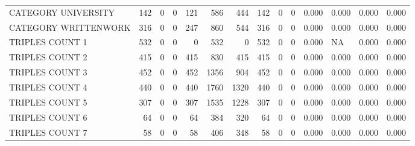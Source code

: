 \begin{tabular}{lrrrrrrrrrllll}
 CATEGORY UNIVERSITY      &             142 &             0 &               0 &             121 &             586 &  444 &  142 &    0 &    0 & 0.000 & 0.000 & 0.000 & 0.000 \\
 CATEGORY WRITTENWORK     &             316 &             0 &               0 &             247 &             860 &  544 &  316 &    0 &    0 & 0.000 & 0.000 & 0.000 & 0.000 \\
 TRIPLES COUNT 1          &             532 &             0 &               0 &               0 &             532 &    0 &  532 &    0 &    0 & 0.000 & NA    & 0.000 & 0.000 \\
 TRIPLES COUNT 2          &             415 &             0 &               0 &             415 &             830 &  415 &  415 &    0 &    0 & 0.000 & 0.000 & 0.000 & 0.000 \\
 TRIPLES COUNT 3          &             452 &             0 &               0 &             452 &            1356 &  904 &  452 &    0 &    0 & 0.000 & 0.000 & 0.000 & 0.000 \\
 TRIPLES COUNT 4          &             440 &             0 &               0 &             440 &            1760 & 1320 &  440 &    0 &    0 & 0.000 & 0.000 & 0.000 & 0.000 \\
 TRIPLES COUNT 5          &             307 &             0 &               0 &             307 &            1535 & 1228 &  307 &    0 &    0 & 0.000 & 0.000 & 0.000 & 0.000 \\
 TRIPLES COUNT 6          &              64 &             0 &               0 &              64 &             384 &  320 &   64 &    0 &    0 & 0.000 & 0.000 & 0.000 & 0.000 \\
 TRIPLES COUNT 7          &              58 &             0 &               0 &              58 &             406 &  348 &   58 &    0 &    0 & 0.000 & 0.000 & 0.000 & 0.000 \\
\hline
\end{tabular}